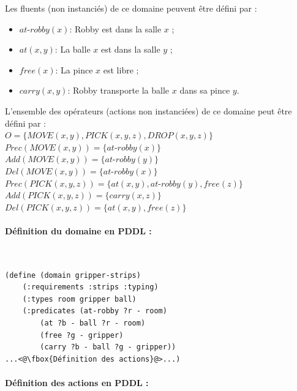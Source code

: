 \newpage

\noindent Les fluents (non instanciés) de ce domaine peuvent être défini par :
\begin{itemize}
	\item $at$-$robby(x)$: Robby est dans la salle $x$ ;
	\item $at(x,y)$: La balle $x$ est dans la salle $y$ ;
	\item $free(x)$: La pince $x$ est libre ;
	\item $carry(x,y)$: Robby transporte la balle $x$ dans sa pince $y$.
\end{itemize}

\noindent L'ensemble des opérateurs (actions non instanciées) de ce domaine peut être défini par :\\ $O=\{MOVE(x,y),PICK(x,y,z),DROP(x,y,z)\}$\\

\noindent $Prec(MOVE(x,y)) = \{at$-$robby(x)\}$\\
$Add(MOVE(x,y)) = \{at$-$robby(y)\}$\\
$Del(MOVE(x,y)) = \{at$-$robby(x)\}$\\

\noindent $Prec(PICK(x,y,z)) = \{at(x,y),at$-$robby(y),free(z)\}$\\
$Add(PICK(x,y,z)) = \{carry(x,z)\}$\\
$Del(PICK(x,y,z)) = \{at(x,y),free(z)\}$




\paragraph{Définition du domaine en PDDL :}~\\

\begin{lstlisting}[language=pddl,frame=single]
(define (domain gripper-strips)
    (:requirements :strips :typing)
    (:types room gripper ball)
    (:predicates (at-robby ?r - room)
        (at ?b - ball ?r - room)
        (free ?g - gripper)
        (carry ?b - ball ?g - gripper))
...<@\fbox{Définition des actions}@>...)
\end{lstlisting}

\paragraph{Définition des actions en PDDL :}~\\

